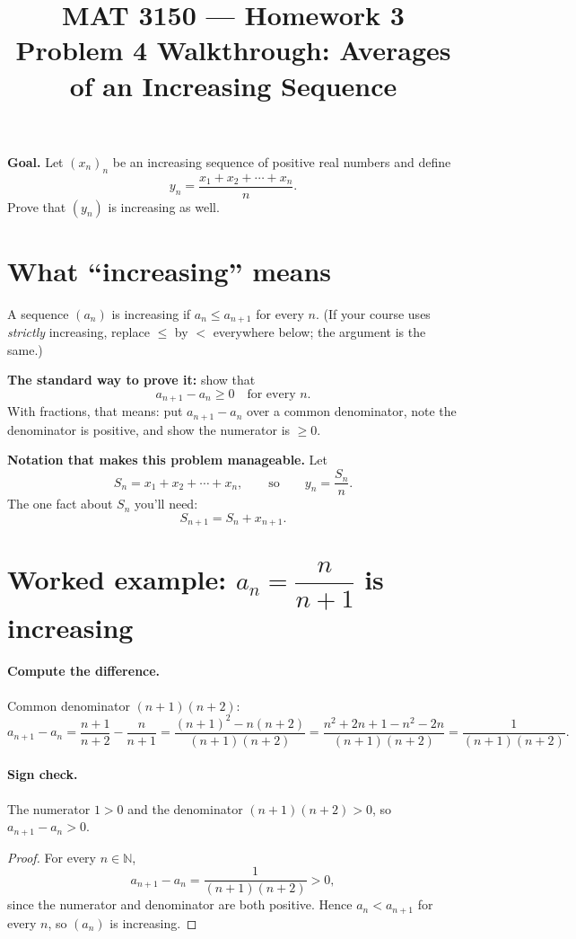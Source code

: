 \documentclass[11pt]{article}
\title{MAT 3150 --- Homework 3\\
\large Problem 4 Walkthrough: Averages of an Increasing Sequence}
\author{}
\date{}
\begin{document}
\maketitle

\textbf{Goal.} Let $(x_n)_n$ be an increasing sequence of positive real
numbers and define
\[
  y_n=\frac{x_1+x_2+\cdots+x_n}{n}.
\]
Prove that $(y_n)$ is increasing as well.

\section*{What ``increasing'' means}
A sequence $(a_n)$ is increasing if $a_n \le a_{n+1}$ for every $n$.
(If your course uses \emph{strictly} increasing, replace $\le$ by $<$
everywhere below; the argument is the same.)

\textbf{The standard way to prove it:} show that
\[
  a_{n+1} - a_n \ge 0 \quad\text{for every } n .
\]
With fractions, that means: put $a_{n+1}-a_n$ over a common denominator,
note the denominator is positive, and show the numerator is $\ge 0$.

\textbf{Notation that makes this problem manageable.} Let
\[
  S_n = x_1 + x_2 + \cdots + x_n, \qquad\text{so}\qquad y_n = \frac{S_n}{n}.
\]
The one fact about $S_n$ you'll need:
\[
  S_{n+1} = S_n + x_{n+1}.
\]

\section*{Worked example: $a_n = \dfrac{n}{n+1}$ is increasing}

\paragraph{Compute the difference.} Common denominator $(n+1)(n+2)$:
\[
  a_{n+1}-a_n = \frac{n+1}{n+2}-\frac{n}{n+1}
  = \frac{(n+1)^2 - n(n+2)}{(n+1)(n+2)}
  = \frac{n^2+2n+1 - n^2-2n}{(n+1)(n+2)}
  = \frac{1}{(n+1)(n+2)} .
\]

\paragraph{Sign check.} The numerator $1>0$ and the denominator
$(n+1)(n+2)>0$, so $a_{n+1}-a_n>0$.

\begin{proof}
For every $n\in\mathbb{N}$,
\[
  a_{n+1}-a_n = \frac{1}{(n+1)(n+2)} > 0,
\]
since the numerator and denominator are both positive. Hence
$a_n < a_{n+1}$ for every $n$, so $(a_n)$ is increasing.
\end{proof}
\end{document}

